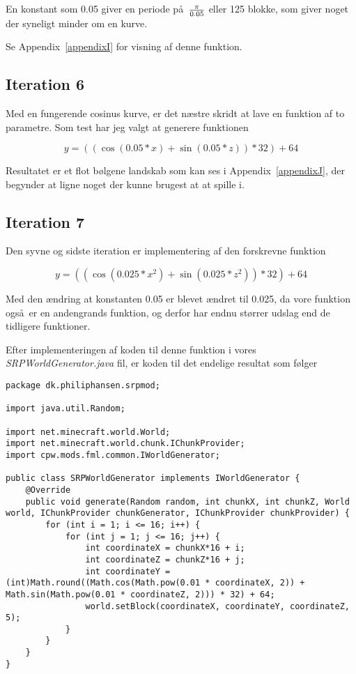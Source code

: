 \documentclass[a4paper,12pt]{report}
\begin{document}
			En konstant som 0.05 giver en periode p\aa \ \( \pi \over 0.05\) eller 125 blokke, som giver noget der syneligt
			minder om en kurve.

			Se Appendix~\ref{appendixI} for visning af denne funktion.
		 \subsection{Iteration 6}
			Med en fungerende cosinus kurve, er det n\ae stre skridt at lave en funktion af to parametre.
			Som test har jeg valgt at generere funktionen

			\[y = ((\cos (0.05 * x) + \sin (0.05 * z)) * 32) + 64\]

			Resultatet er et flot b\o lgene landskab som kan ses i Appendix~\ref{appendixJ}, der begynder at ligne noget der kunne brugest at at spille i.
		\subsection{Iteration 7}
			Den syvne og sidste iteration er implementering af den forskrevne funktion 

			\[y = ((\cos (0.025 * x^2) + \sin (0.025 * z^2)) * 32) + 64\]

			Med den \ae ndring at konstanten 0.05 er blevet \ae ndret til 0.025, da vore funktion ogs\aa \ er en andengrands funktion,
			og derfor har endnu st\o rrer udslag end de tidligere funktioner.

			Efter implementeringen af koden til denne funktion i vores \emph{SRPWorldGenerator.java} fil, er koden til det endelige resultat som
			f\o lger

\begin{lstlisting}[label=SRPWorldGenerator-final,caption=SRPWorldGenerator.java]
package dk.philiphansen.srpmod;

import java.util.Random;

import net.minecraft.world.World;
import net.minecraft.world.chunk.IChunkProvider;
import cpw.mods.fml.common.IWorldGenerator;

public class SRPWorldGenerator implements IWorldGenerator {
    @Override
    public void generate(Random random, int chunkX, int chunkZ, World world, IChunkProvider chunkGenerator, IChunkProvider chunkProvider) {
        for (int i = 1; i <= 16; i++) {
            for (int j = 1; j <= 16; j++) {
                int coordinateX = chunkX*16 + i;
                int coordinateZ = chunkZ*16 + j;
                int coordinateY = (int)Math.round((Math.cos(Math.pow(0.01 * coordinateX, 2)) + Math.sin(Math.pow(0.01 * coordinateZ, 2))) * 32) + 64;
                world.setBlock(coordinateX, coordinateY, coordinateZ, 5);			
            }
        }
    }
}
\end{lstlisting}
\end{document}
